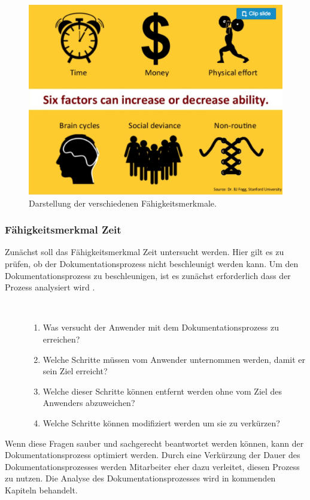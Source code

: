 \documentclass[a4paper,12pt]{scrartcl}
\begin{document}
\begin{figure}[h!]
\begin{center}
\includegraphics[scale = 0.4]{Bilder/Faehigkeitenfaktoren.eps}
\caption{Darstellung der verschiedenen Fähigkeitsmerkmale. \cite{Merkmale2018}}
\label{FähigkeitsmerkmaleBild}
\end{center}
\end{figure}
\subsubsection{Fähigkeitsmerkmal Zeit}
Zunächst soll das Fähigkeitsmerkmal Zeit untersucht werden. Hier gilt es zu prüfen, ob der Dokumentationsprozess nicht beschleunigt werden kann. Um den Dokumentationsprozess zu beschleunigen, ist es zunächst erforderlich dass der Prozess analysiert wird \cite{Hauptly2008}.
\begin{description}
   \item[\parbox{\textwidth}{Um den Dokumentationsprozess sachgemäß zu analysieren müssen die Folgenden Fragen beantwortet werden: \normalfont\vspace{0.5ex}}]~\par
   \begin{enumerate}
      \item Was versucht der Anwender mit dem Dokumentationsprozess zu erreichen?
      \item Welche Schritte müssen vom Anwender unternommen werden, damit er sein Ziel erreicht?
      \item Welche dieser Schritte können entfernt werden ohne vom Ziel des Anwenders abzuweichen?
      \item Welche Schritte können modifiziert werden um sie zu verkürzen?
   \end{enumerate}
\end{description}
Wenn diese Fragen sauber und sachgerecht beantwortet werden können, kann der Dokumentationsprozess optimiert werden. Durch eine Verkürzung der Dauer des Dokumentationsprozesses werden Mitarbeiter eher dazu verleitet, diesen Prozess zu nutzen. Die Analyse des Dokumentationsprozesses wird in kommenden Kapiteln behandelt.
\end{document}
